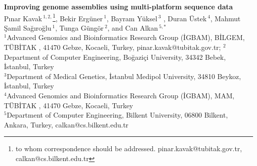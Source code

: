\documentclass[12pt]{article}
\begin{document}
 \renewcommand{\thefootnote}{\fnsymbol{footnote}} 

\begin{center}
  {\bf Improving genome assemblies using multi-platform sequence data}\\

  P\i nar Kavak\,$^{1,2,}$\footnote{to whom correspondence should be addressed. pinar.kavak@tubitak.gov.tr, calkan@cs.bilkent.edu.tr}, Bekir Erg\"{u}ner\,$^{1}$, Bayram Y\"{u}ksel\,$^{3}$ , Duran \"{U}stek\,$^{4}$, Mahmut \c{S}amil Sa\u{g}\i ro\u{g}lu\,$^1$, 
  Tunga G\"{u}ng\"{o}r\,$^{2}$, and 
  Can Alkan\,$^{5,*}$ \\ 

  {\scriptsize
  $^{1}$Advanced Genomics and Bioinformatics Research Group (\.{I}GBAM), B\.{I}LGEM, %
  T\"{U}B\.{I}TAK%
, 41470 Gebze, Kocaeli, Turkey, pinar.kavak@tubitak.gov.tr;
  $^{2}$Department of Computer Engineering, Bo\u{g}azi\c{c}i University, 34342 Bebek, \.{I}stanbul, Turkey\\
  $^{3}$Department of Medical Genetics, \.{I}stanbul Medipol University, 34810 Beykoz, \.{I}stanbul, Turkey\\
  $^{4}$Advanced Genomics and Bioinformatics Research Group (\.{I}GBAM), MAM,%
  T\"{U}B\.{I}TAK%
, 41470 Gebze, Kocaeli, Turkey\\
  $^{5}$Department of Computer Engineering, Bilkent University, 06800 Bilkent, Ankara, Turkey, calkan@cs.bilkent.edu.tr
  }
\end{center}

\begin{abstract}
\textit{De novo} assembly  using short reads generated by next generation sequencing technologies is still an open problem. Although there are several assembly algorithms developed for data generated with different sequencing technologies, and some that can make use of hybrid data, the assemblies are still far from being perfect. There is still a need for computational approaches to improve draft assemblies.
Here we propose a new method to correct assembly mistakes when there are multiple types of data obtained using different sequencing technologies that have different strengths and biases.
We apply our method to Illumina, 454, and Ion Torrent data, and also compare our results with existing hybrid assemblers, Celera and Masurca.
\end{abstract}
\end{document}

